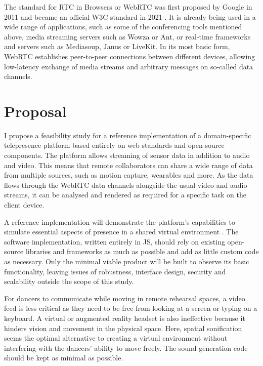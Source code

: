 The standard for \ac{RTC} in Browsers or \ac{WebRTC} \parencite{webRtcSpec} was first proposed by Google in 2011 and became an official \ac{W3C} standard in 2021 \parencite{webRtcOfficialWebStandard}. It is already being used in a wide range of applications, such as some of the conferencing tools mentioned above, media streaming servers such as Wowza or Ant, or real-time frameworks and servers such as Mediasoup, Janus or LiveKit. In its most basic form, \ac{WebRTC} establishes peer-to-peer connections between different devices, allowing low-latency exchange of media streams and arbitrary messages on so-called data channels.

\section{Proposal}

I propose a feasibility study for a reference implementation of a domain-specific telepresence platform based entirely on web standards and open-source components. The platform allows streaming of sensor data in addition to audio and video. This means that remote collaborators can share a wide range of data from multiple sources, such as motion capture, wearables and more. As the data flows through the WebRTC data channels alongside the usual video and audio streams, it can be analysed and rendered as required for a specific task on the client device.

A reference implementation will demonstrate the platform's capabilities to simulate essential aspects of presence in a shared virtual environment \parencite{surveyOfPresence}. The software implementation, written entirely in \ac{JS}, should rely on existing open-source libraries and frameworks as much as possible and add as little custom code as necessary. Only the minimal viable product will be built to observe its basic functionality, leaving issues of robustness, interface design, security and scalability outside the scope of this study.

For dancers to communicate while moving in remote rehearsal spaces, a video feed is less critical as they need to be free from looking at a screen or typing on a keyboard. A virtual or augmented reality headset is also ineffective because it hinders vision and movement in the physical space. Here, spatial sonification seems the optimal alternative to creating a virtual environment without interfering with the dancers' ability to move freely. The sound generation code should be kept as minimal as possible.

